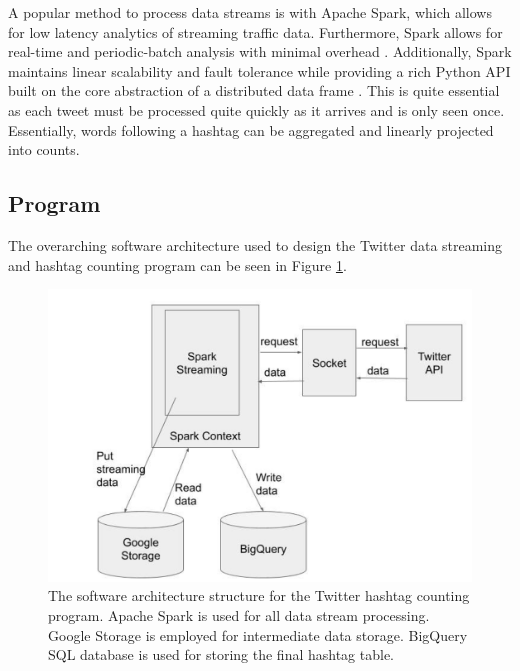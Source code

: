 \documentclass[conference]{IEEEtran}
\begin{document}
A popular method to process data streams is with Apache Spark, which allows for low latency analytics of streaming traffic data. Furthermore, Spark allows for real-time and periodic-batch analysis with minimal overhead \cite{7364101}. Additionally, Spark maintains linear scalability and fault tolerance while providing a rich Python API built on the core abstraction of a distributed data frame \cite{Shanahan:2015:LSD:2783258.2789993}. This is quite essential as each tweet must be processed quite quickly as it arrives and is only seen once. Essentially, words following a hashtag can be aggregated and linearly projected into counts. \par

\subsection{Program}

The overarching software architecture used to design the Twitter data streaming and hashtag counting program can be seen in Figure \ref{fig:software_architecture}.

\begin{figure}
    \centering
    \includegraphics[scale=0.5]{img/software_architecture.PNG}
    \caption{The software architecture structure for the Twitter hashtag counting program. Apache Spark is used for all data stream processing. Google Storage is employed for intermediate data storage. BigQuery SQL database is used for storing the final hashtag table.}
    \label{fig:software_architecture}
\end{figure}
\end{document}
